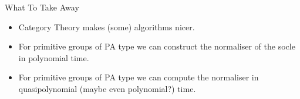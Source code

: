\begin{frame}{What To Take Away}
    \begin{itemize}
        \item
        Category Theory makes (some) algorithms nicer.
        \pause
        \item
        For primitive groups of PA type
        we can construct the normaliser of the socle in polynomial time.
        \pause
        \item
        For primitive groups of PA type
        we can compute the normaliser in quasipolynomial (maybe even
        polynomial?) time.
    \end{itemize}
\end{frame}
